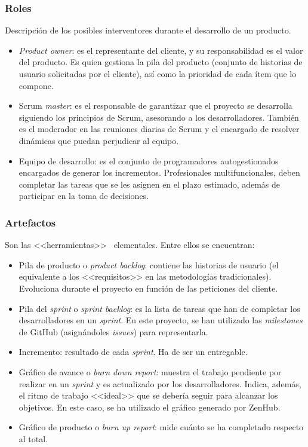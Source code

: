 \subsubsection{Roles}
Descripción de los posibles interventores durante el desarrollo de un producto.

\begin{itemize}
	\item \textit{Product owner}: es el representante del cliente, y su responsabilidad es el valor del producto. Es quien gestiona la pila del producto (conjunto de historias de usuario solicitadas por el cliente), así como la prioridad de cada ítem que lo compone.
	
	\item Scrum \textit{master}: es el responsable de garantizar que el proyecto se desarrolla siguiendo los principios de Scrum, asesorando a los desarrolladores. También es el moderador en las reuniones diarias de Scrum y el encargado de resolver dinámicas que puedan perjudicar al equipo.
	
	\item Equipo de desarrollo: es el conjunto de programadores autogestionados encargados de generar los incrementos. Profesionales multifuncionales, deben completar las tareas que se les asignen en el plazo estimado, además de participar en la toma de decisiones.
\end{itemize}

\subsubsection{Artefactos}

Son las <<herramientas>>~\cite{scrumMaster2022} elementales. Entre ellos se encuentran:

\begin{itemize}
	\item Pila de producto o \textit{product backlog}: contiene las historias de usuario (el equivalente a los <<requisitos>> en las metodologías tradicionales). Evoluciona durante el proyecto en función de las peticiones del cliente.
	\item Pila del \textit{sprint} o \textit{sprint backlog}: es la lista de tareas que han de completar los desarrolladores en un \textit{sprint}. En este proyecto, se han utilizado las \textit{milestones} de GitHub (asignándoles \textit{issues}) para representarla.
	\item Incremento: resultado de cada \textit{sprint}. Ha de ser un entregable.
	\item Gráfico de avance o \textit{burn down report}: muestra el trabajo pendiente por realizar en un \textit{sprint} y es actualizado por los desarrolladores. Indica, además, el ritmo de trabajo <<ideal>> que se debería seguir para alcanzar los objetivos. En este caso, se ha utilizado el gráfico generado por ZenHub.
	\item Gráfico de producto o \textit{burn up report}: mide cuánto se ha completado respecto al total.
\end{itemize}

